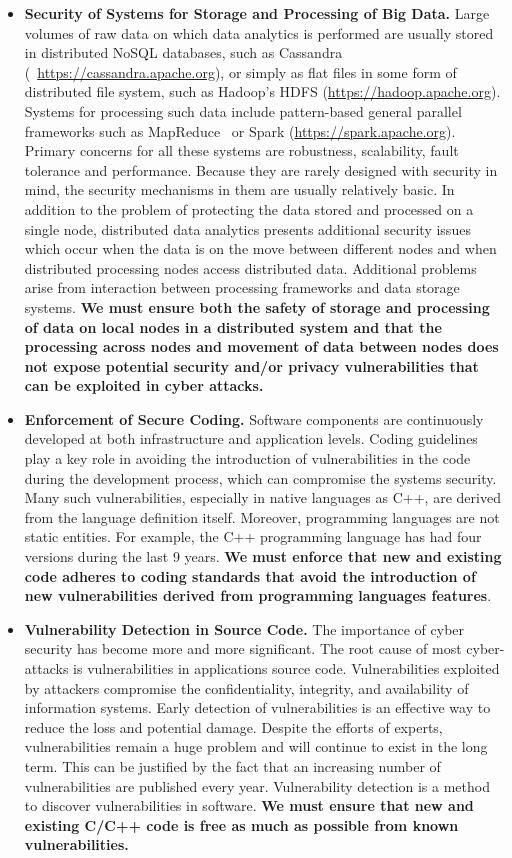 \documentclass[a4paper,11pt]{article}
\begin{document}
\begin{itemize}
\item \textbf{Security of Systems for Storage and Processing of Big Data.} Large volumes of raw data on which data analytics is performed are usually stored in distributed NoSQL databases, such as Cassandra (~\url{https://cassandra.apache.org}), or simply as flat files in some form of distributed file system, such as Hadoop's HDFS (\url{https://hadoop.apache.org}). Systems for processing such data include pattern-based general parallel frameworks such as MapReduce~\cite{mapreduce} or Spark (\url{https://spark.apache.org}). Primary concerns for all these systems are robustness, scalability, fault tolerance and performance. Because they are rarely designed with security in mind, the security mechanisms in them are usually relatively basic. In addition to the problem of protecting the data stored and processed on a single node, distributed data analytics presents additional security issues which occur when the data is on the move between different nodes and when distributed processing nodes access distributed data. Additional problems arise from interaction between processing frameworks and data storage systems. \textbf{We must ensure both the safety of storage and processing of data on local nodes in a distributed system and that the processing across nodes and movement of data between nodes does not expose potential security and/or privacy vulnerabilities that can be exploited in cyber attacks.}

\item \textbf{Enforcement of Secure Coding.} Software components are continuously developed at both infrastructure and application levels. Coding guidelines play a key role in avoiding the introduction of vulnerabilities in the code during the development process, which can compromise the systems security. Many such vulnerabilities, especially in native languages as C++, are derived from the language definition itself. Moreover, programming languages are not static entities. For example, the C++ programming language has had four versions during the last 9 years. \textbf{We must enforce that new and existing code adheres to coding standards that avoid the introduction of new vulnerabilities derived from programming languages features}. 

\item \textbf{Vulnerability Detection in Source Code.} The importance of cyber security has become more and more signiﬁcant. The root cause of most cyber-attacks is vulnerabilities in applications source code. Vulnerabilities exploited by attackers compromise the conﬁdentiality, integrity, and availability of information systems. Early detection of vulnerabilities is an eﬀective way to reduce the loss and potential damage. Despite the efforts of experts, vulnerabilities remain a huge problem and will continue to exist in the long term. This can be justiﬁed by the fact that an increasing number of vulnerabilities are published every year. Vulnerability detection is a method to discover vulnerabilities in software. \textbf{We must ensure that new and existing C/C++ code is free as much as possible from known vulnerabilities.}


\end{itemize}
\end{document}
